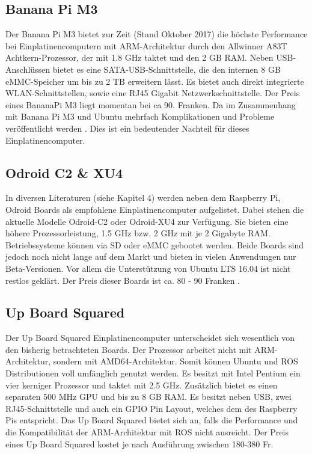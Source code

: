 \subsection{Banana Pi M3}
\label{subsec:BananaPi}
Der Banana Pi M3 bietet zur Zeit (Stand Oktober 2017) die höchste Performance bei Einplatinencomputern mit \ac{ARM}-Architektur durch den Allwinner A83T Achtkern-Prozessor, der mit 1.8 GHz taktet und den 2 GB RAM. Neben USB-Anschlüssen bietet es eine SATA-USB-Schnittstelle, die den internen 8 GB \ac{eMMC}-Speicher um bis zu 2 TB erweitern lässt. Es bietet auch direkt integrierte WLAN-Schnittstellen, sowie eine RJ45 Gigabit Netzwerkschnittstelle. Der Preis eines BananaPi M3 liegt momentan bei ca 90. Franken. Da im Zusammenhang mit Banana Pi M3 und Ubuntu mehrfach Komplikationen und Probleme veröffentlicht werden \cite{rpi} \cite{banana}. Dies ist ein bedeutender Nachteil für dieses Einplatinencomputer. 

\subsection{Odroid C2 \& XU4} 
\label{subsec:Odroid}
In diversen Literaturen (siehe \cite{ROSprojects} Kapitel 4) werden neben dem Raspberry Pi, Odroid Boards als empfohlene Einplatinencomputer aufgelistet. Dabei stehen die aktuelle Modelle Odroid-C2 oder Odroid-XU4 zur Verfügung. Sie bieten eine höhere Prozessorleistung, 1.5 GHz bzw. 2 GHz mit je 2 Gigabyte \ac{RAM}. Betriebssysteme können via \ac{SD} oder \ac{eMMC} gebootet werden. Beide Boards sind jedoch noch nicht lange auf dem Markt und bieten in vielen Anwendungen nur Beta-Versionen. Vor allem die Unterstützung von Ubuntu LTS 16.04 ist nicht restlos geklärt. Der Preis dieser Boards ist ca. 80 - 90 Franken \cite{rpi}.

\subsection{Up Board Squared} 
\label{subsec:Up Board Squared}
Der Up Board Squared Einplatinencomputer unterscheidet sich wesentlich von den bisherig betrachteten Boards. Der Prozessor arbeitet nicht mit \ac{ARM}-Architektur, sondern mit \ac{AMD64}-Architektur. Somit können Ubuntu und ROS Distributionen voll umfänglich genutzt werden. Es besitzt mit Intel Pentium ein vier kerniger Prozessor und taktet mit 2.5 GHz. Zusätzlich bietet es einen separaten 500 MHz \ac{GPU} und bis zu 8 GB \ac{RAM}. Es besitzt neben USB, zwei RJ45-Schnittstelle und auch ein GPIO Pin Layout, welches dem des Raspberry Pis entspricht. Das Up Board Squared bietet sich an, falls die Performance und die Kompatibilität der ARM-Architektur mit ROS nicht ausreicht. Der Preis eines Up Board Squared kostet je nach Ausführung zwischen 180-380 Fr.


